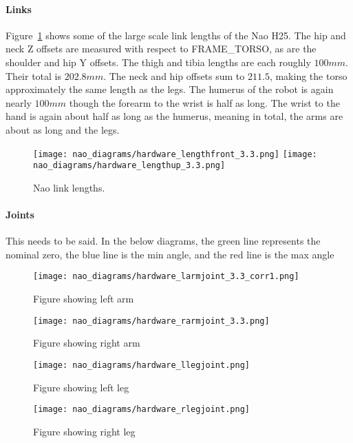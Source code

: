 \paragraph{Links}
Figure~\ref{fig:nao_link_lengths1} shows some of the large scale link lengths
of the Nao H25. The hip and neck Z offsets are measured with respect to
FRAME\_TORSO, as are the shoulder and hip Y offsets. The thigh and tibia lengths
are each roughly $100 mm$. Their total is $202.8 mm$. The neck and hip offsets
sum to $211.5$, making the torso approximately the same length as the legs.
The humerus of the robot is again nearly $100 mm$ though the forearm to the wrist
is half as long. The wrist to the hand is again about half as long as the
humerus, meaning in total, the arms are about as long and the legs.

\begin{figure}
\centerline{\texttt{[image: nao\_diagrams/hardware\_lengthfront\_3.3.png]}
            \texttt{[image: nao\_diagrams/hardware\_lengthup\_3.3.png]}
}
\caption{Nao link lengths.}
\label{fig:nao_link_lengths1}
\end{figure}

\paragraph{Joints}
This needs to be said.
In the below diagrams, the green line represents the nominal zero, the blue line
is the min angle, and the red line is the max angle
\begin{figure}
\centering
\texttt{[image: nao\_diagrams/hardware\_larmjoint\_3.3\_corr1.png]}
\caption{Figure showing left arm}
\label{fig:nao_arm_joints_left1}
\end{figure}

\begin{figure}
\centering
\texttt{[image: nao\_diagrams/hardware\_rarmjoint\_3.3.png]}
\caption{Figure showing right arm}
\label{fig:nao_arm_joints_right1}
\end{figure}

\begin{figure}
\centering
\texttt{[image: nao\_diagrams/hardware\_llegjoint.png]}
\caption{Figure showing left leg}
\label{fig:nao_leg_joints_left1}
\end{figure}

\begin{figure}
\centering
\texttt{[image: nao\_diagrams/hardware\_rlegjoint.png]}
\caption{Figure showing right leg}
\label{fig:nao_leg_joints_right1}
\end{figure}

